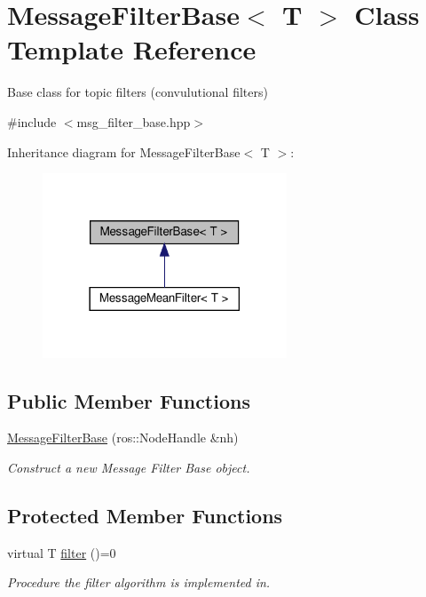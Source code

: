 \hypertarget{classMessageFilterBase}{}\section{Message\+Filter\+Base$<$ T $>$ Class Template Reference}
\label{classMessageFilterBase}


Base class for topic filters (convulutional filters)  




{\ttfamily \#include $<$msg\+\_\+filter\+\_\+base.\+hpp$>$}



Inheritance diagram for Message\+Filter\+Base$<$ T $>$\+:
\nopagebreak
\begin{figure}[H]
\begin{center}
\leavevmode
\includegraphics[width=206pt]{d3/d58/classMessageFilterBase__inherit__graph}
\end{center}
\end{figure}
\subsection*{Public Member Functions}
\begin{DoxyCompactItemize}
\item 
\hyperlink{classMessageFilterBase_aeb8e41a157fef0bcf63bd8061eea4b4a}{Message\+Filter\+Base} (ros\+::\+Node\+Handle \&nh)
\begin{DoxyCompactList}\small\item\em Construct a new Message Filter Base object. \end{DoxyCompactList}\end{DoxyCompactItemize}
\subsection*{Protected Member Functions}
\begin{DoxyCompactItemize}
\item 
virtual T \hyperlink{classMessageFilterBase_a9ddc835d7366cacf63ba4a4e42839f6b}{filter} ()=0
\begin{DoxyCompactList}\small\item\em Procedure the filter algorithm is implemented in. \end{DoxyCompactList}\end{DoxyCompactItemize}
